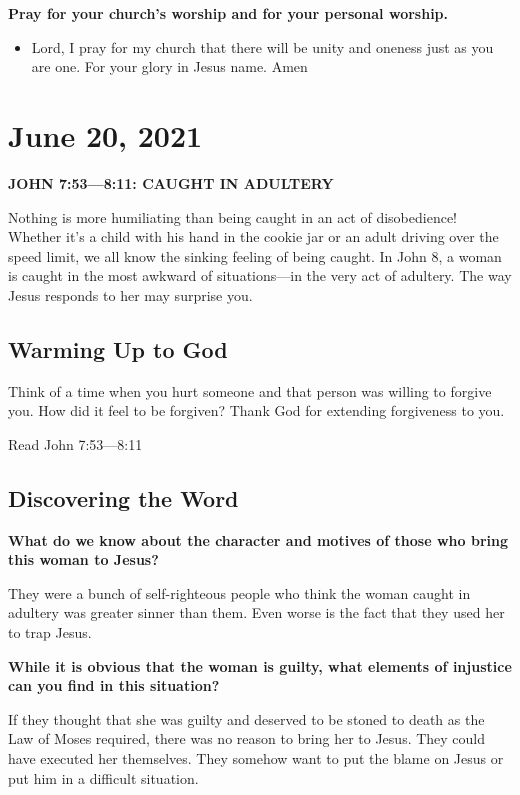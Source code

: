 \documentclass[11pt]{article}
\begin{document}
\textbf{\textbf{Pray for your church's worship and for your personal worship.}}
\begin{itemize}
\item Lord, I pray for my church that there will be unity and oneness just as you are one. For your glory in Jesus name. Amen
\end{itemize}


\section{June 20, 2021}
\label{sec:org5818e03}

\textbf{\textbf{JOHN 7:53—8:11: CAUGHT IN ADULTERY}}

Nothing is more humiliating than being caught in an act of
disobedience! Whether it's a child with his hand in the cookie jar or
an adult driving over the speed limit, we all know the sinking
feeling of being caught. In John 8, a woman is caught in the most
awkward of situations—in the very act of adultery. The way Jesus
responds to her may surprise you.

\subsection{Warming Up to God}
\label{sec:org932e709}

Think of a time when you hurt someone and that person was willing
to forgive you. How did it feel to be forgiven? Thank God for
extending forgiveness to you.

Read John 7:53—8:11

\subsection{Discovering the Word}
\label{sec:org067458f}

\textbf{\textbf{What do we know about the character and motives of those who bring this woman to Jesus?}}

They were a bunch of self-righteous people who think the woman caught
in adultery was greater sinner than them. Even worse is the fact that
they used her to trap Jesus.

\textbf{\textbf{While it is obvious that the woman is guilty, what elements of injustice can you find in this situation?}}

If they thought that she was guilty and deserved to be stoned to death
as the Law of Moses required, there was no reason to bring her to
Jesus. They could have executed her themselves. They somehow want to
put the blame on Jesus or put him in a difficult situation.
\end{document}

